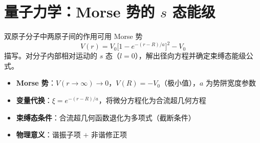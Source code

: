 \section{量子力学：Morse 势的 \texorpdfstring{$s$}{s} 态能级}
\label{sec:morse-potential-s-level}

\begin{modelbox}
双原子分子中两原子间的作用可用 Morse 势
\[
V(r)=V_0\bigl[1-e^{-(r-R)/a}\bigr]^2-V_0
\]
描写。对分子内部相对运动的 $s$ 态（$l=0$），解出径向方程并确定束缚态能级公式。
\end{modelbox}

\begin{tipbox}[考点快速分析]
\begin{itemize}
    \item \textbf{Morse 势}：$V(r\to\infty)\to0$，$V(R)=-V_0$（极小值），$a$ 为势阱宽度参数
    \item \textbf{变量代换}：$\xi=e^{-(r-R)/a}$，将微分方程化为合流超几何方程
    \item \textbf{束缚态条件}：合流超几何函数退化为多项式（截断条件）
    \item \textbf{物理意义}：谐振子项 $+$ 非谐修正项
\end{itemize}
\end{tipbox}

